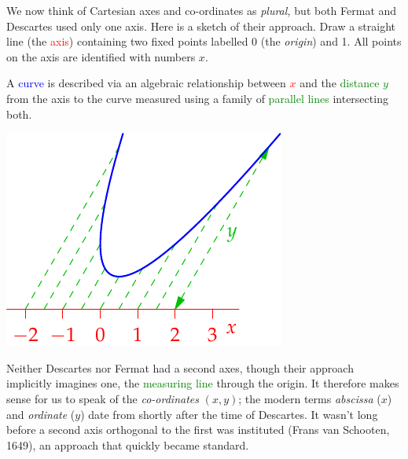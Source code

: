 \begin{minipage}[t]{0.64\linewidth}\vspace{0pt}
We now think of Cartesian axes and co-ordinates as \emph{plural,} but both Fermat and Descartes used only one axis. Here is a sketch of their approach.
\smallbreak
Draw a straight line (the \textcolor{red}{axis}) containing two fixed points labelled 0 (the \emph{origin}) and 1. All points on the axis are identified with numbers $x$.
\par
A \textcolor{blue}{curve} is described via an algebraic relationship between \textcolor{red}{$x$} and the \textcolor{Green}{distance $y$} from the axis to the curve measured using a family of \textcolor{Green}{parallel lines} intersecting both. 
\end{minipage}\hfill\begin{minipage}[t]{0.35\linewidth}\vspace{0pt}
	\flushright\includegraphics{analytic-parab}
\end{minipage}
\medbreak

Neither Descartes nor Fermat had a second axes, though their approach implicitly imagines one, the \textcolor{Green}{measuring line} through the origin. It therefore makes sense for us to speak of the \emph{co-ordinates} $(x,y)$; the modern terms \emph{abscissa} ($x$) and \emph{ordinate} ($y$) date from shortly after the time of Descartes. It wasn't long before a second axis orthogonal to the first was instituted (Frans van Schooten, 1649), an approach that quickly became standard.
\goodbreak

